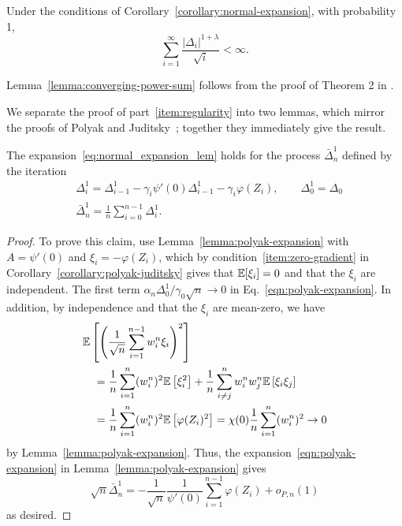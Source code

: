 \begin{lem}
  \label{lemma:converging-power-sum}
  Under the conditions of Corollary~\ref{corollary:normal-expansion},
  with probability 1,
  \begin{equation*}
  \sum_{i=1}^\infty \frac{|\Delta_{i}|^{1+\lambda}}{\sqrt{i}} < \infty.
  \end{equation*}
\end{lem}
\noindent
Lemma~\ref{lemma:converging-power-sum} follows from the proof of Theorem 2
in \cite[page 851]{polyak1992acceleration}.

We separate the proof of part~\eqref{item:regularity} into two lemmas, which
mirror the proofs of Polyak and Juditsky~\cite{polyak1992acceleration}; together they
immediately give the result.

\begin{lemma}
  The expansion~\eqref{eq:normal_expansion_lem} holds for the process
  $\bar{\Delta}^1_n$ defined by the iteration
  \begin{align}
    & \Delta_i^1  = \Delta_{i-1}^1 - \gamma_i \psi'(0) \Delta_{i-1}^1 - \gamma_i \varphi(Z_i), \qquad
    \Delta_0^1 = \Delta_0 \nonumber\\
    & \bar{\Delta}^1_n = \frac{1}{n}\sum_{i=0}^{n-1} \Delta^1_i.
    \label{eqn:polyak-expansion_lem1_alg}
  \end{align}
\end{lemma}
\begin{proof}
  To prove this claim, use Lemma~\ref{lemma:polyak-expansion} with $A =
  \psi'(0)$ and $\xi_i = -\varphi(Z_i)$, which by
  condition~\eqref{item:zero-gradient} in
  Corollary~\ref{corollary:polyak-juditsky} gives that
  $\mathbb{E}[\xi_i] = 0$ and that the $\xi_i$ are independent.
  The first term $\alpha_n \Delta_0^1 / \gamma_0 \sqrt{n} \to 0$
  in Eq.~\eqref{eqn:polyak-expansion}. In addition,
  by independence and that the $\xi_i$ are mean-zero, we have
  \begin{align*}
    & \mathbb{E}\left[  \left( \frac{1}{\sqrt{n}} \sum_{i=1}^{n-1} w_i^n \xi_i \right)^2 \right] \\
     & \quad = \frac{1}{n}  \sum_{i=1}^n (w_i^n)^2 \mathbb{E}\left[  \xi_i^2\right] + \frac{1}{n}  \sum_{i\neq j}^n w_i^n w_j^n \mathbb{E}\left[  \xi_i \xi_j\right] \\
    & \quad = \frac{1}{n}  \sum_{i=1}^n (w_i^n)^2 \mathbb{E}\left[  \varphi(Z_i)^2\right] = \chi(0) \frac{1}{n}  \sum_{i=1}^n (w_i^n)^2 \to 0
  \end{align*}
  by Lemma~\ref{lemma:polyak-expansion}.
  Thus, the expansion~\eqref{eqn:polyak-expansion} in
  Lemma~\ref{lemma:polyak-expansion} gives
  \begin{equation*}
    \sqrt{n} \bar{\Delta}^1_n
    = -\frac{1}{\sqrt{n}} \frac{1}{\psi'(0)}
    \sum_{i=1}^{n-1} \varphi(Z_i)+ o_{P,n}(1)
  \end{equation*}
  as desired.
\end{proof}

